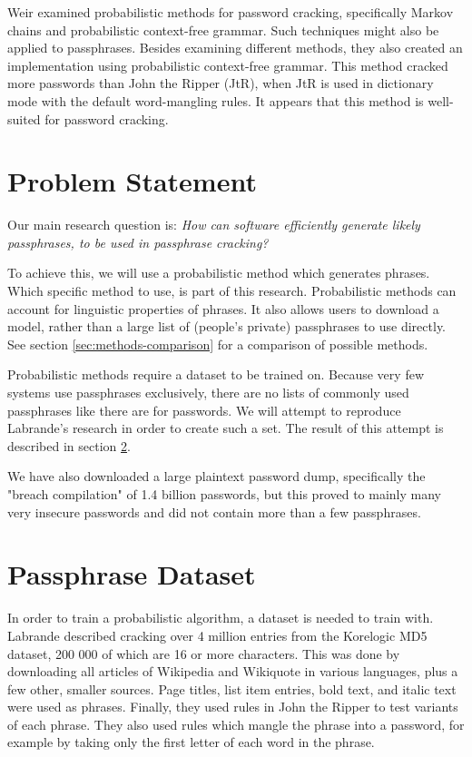 \documentclass{article}
\begin{document}
Weir\cite{weir} examined probabilistic methods for password cracking,
specifically Markov chains and probabilistic context-free grammar. Such
techniques might also be applied to passphrases. Besides examining different
methods, they also created an implementation using probabilistic context-free
grammar. This method cracked more passwords than John the Ripper (JtR), when
JtR is used in dictionary mode with the default word-mangling rules. It appears
that this method is well-suited for password cracking.


\section{Problem Statement}\label{sec:problemstatement}

Our main research question is: {\it How can software efficiently generate
likely passphrases, to be used in passphrase cracking?}

To achieve this, we will use a probabilistic method which generates phrases.
Which specific method to use, is part of this research. Probabilistic methods
can account for linguistic properties of phrases. It also allows users to
download a model, rather than a large list of (people's private) passphrases to
use directly. See section \ref{sec:methods-comparison} for a comparison of
possible methods.

Probabilistic methods require a dataset to be trained on. Because very few
systems use passphrases exclusively, there are no lists of commonly used
passphrases like there are for passwords. We will attempt to reproduce
Labrande's research\cite{crackmeimfamous} in order to create such a set. The
result of this attempt is described in section \ref{sec:dataset}.

We have also downloaded a large plaintext password dump, specifically the
"breach compilation" of 1.4 billion passwords, but this proved to mainly many
very insecure passwords and did not contain more than a few passphrases.


\section{Passphrase Dataset}\label{sec:dataset}

In order to train a probabilistic algorithm, a dataset is needed to train with.
Labrande\cite{crackmeimfamous} described cracking over 4 million entries from
the Korelogic\cite{korelogic} MD5 dataset, 200 000 of which are 16 or more
characters. This was done by downloading all articles of Wikipedia and
Wikiquote in various languages, plus a few other, smaller sources. Page titles,
list item entries, bold text, and italic text were used as phrases. Finally,
they used rules in John the Ripper to test variants of each phrase. They also
used rules which mangle the phrase into a password, for example by taking only
the first letter of each word in the phrase.
\end{document}
